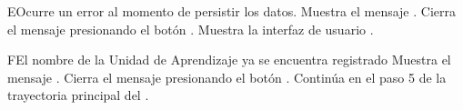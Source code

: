     \begin{UCtrayectoriaA}{E}{Ocurre un error al momento de persistir los datos.}
    	\UCpaso Muestra el mensaje .
    	\UCpaso[\UCactor] Cierra el mensaje presionando el botón .
    	\UCpaso Muestra la interfaz de usuario .
    \end{UCtrayectoriaA}


    \begin{UCtrayectoriaA}{F}{El nombre de la Unidad de Aprendizaje ya se encuentra registrado}
    	\UCpaso Muestra el mensaje .
    	\UCpaso[\UCactor] Cierra el mensaje presionando el botón .
    	\UCpaso Continúa en el paso 5 de la trayectoria principal del .
    \end{UCtrayectoriaA}

